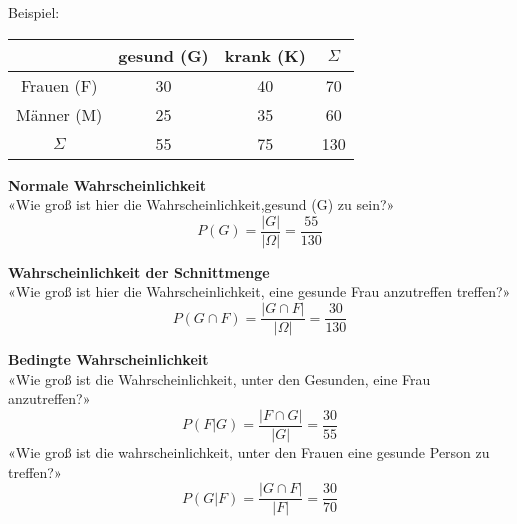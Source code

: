 \begin{multicols}{2}
Beispiel:

\begin{tabular}{c|c|c|c}
           & gesund (G)& krank (K)& $\Sigma$ \\\hline
Frauen (F) &        30 &       40 &       70 \\\hline
Männer (M) &        25 &       35 &       60 \\\hline
$\Sigma$   &        55 &       75 &      130 \\\hline
 \end{tabular}

\textbf{Normale Wahrscheinlichkeit}\\
«Wie groß ist hier die Wahrscheinlichkeit,gesund (G) zu sein?»
$$P(G) = \frac{|G|}{|\Omega|} = \frac{55}{130}$$

\textbf{Wahrscheinlichkeit der Schnittmenge}\\
«Wie groß ist hier die Wahrscheinlichkeit, eine gesunde Frau anzutreffen treffen?»
$$P(G\cap F) = \frac{|G\cap F|}{|\Omega|} = \frac{30}{130}$$

\textbf{Bedingte Wahrscheinlichkeit}\\
«Wie groß ist die Wahrscheinlichkeit, unter den Gesunden, eine Frau anzutreffen?»
$$P(F | G) = \frac{|F\cap G|}{|G|} = \frac{30}{55}$$
«Wie groß ist die wahrscheinlichkeit, unter den Frauen eine gesunde Person zu treffen?»
$$P(G | F) = \frac{|G \cap F|}{|F|} = \frac{30}{70}$$




\end{multicols}


